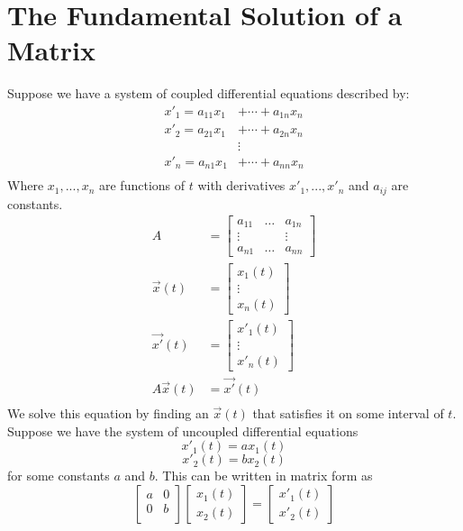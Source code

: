 \section{The Fundamental Solution of a Matrix}
Suppose we have a system of coupled differential equations described by:
\begin{align*}
    x'_1 = a_{11}x_1 &+ \cdots + a_{1n}x_n \\
    x'_2 = a_{21}x_1 &+ \cdots + a_{2n}x_n \\
    &\vdots \\
    x'_n = a_{n1}x_1 &+ \cdots + a_{nn}x_n \\
\end{align*}
Where $x_1,...,x_n$ are functions of $t$ with derivatives $x'_1,...,x'_n$ and $a_{ij}$ are constants. 
\begin{align*}
    A &= \begin{bmatrix} 
        a_{11} & \hdots & a_{1n} \\ 
        \vdots & & \vdots \\ 
        a_{n1} & \hdots & a_{nn} 
    \end{bmatrix} \\
    \vec{x}(t) &= \begin{bmatrix} 
        x_1(t) \\ 
        \vdots \\ 
        x_n(t) 
    \end{bmatrix} \\
    \vec{x'}(t) &= \begin{bmatrix} 
        x'_1(t) \\ 
        \vdots \\ 
        x'_n(t) 
    \end{bmatrix} \\
    A\vec{x}(t) &= \vec{x'}(t) \\
\end{align*}
We solve this equation by finding an $\vec{x}(t)$ that satisfies it on some interval of $t$.
\noindent Suppose we have the system of uncoupled differential equations
\[x'_1(t) = ax_1(t)\]
\[x'_2(t) = bx_2(t)\]
for some constants $a$ and $b$. 
This can be written in matrix form as
\[\begin{bmatrix}
    a & 0 \\
    0 & b \\
\end{bmatrix}
\begin{bmatrix}
    x_1(t) \\
    x_2(t)
\end{bmatrix} = \begin{bmatrix} 
x'_1(t) \\
x'_2(t) 
\end{bmatrix}\]
